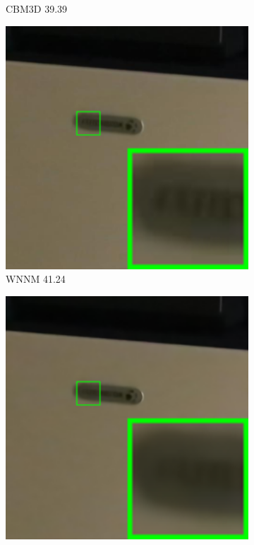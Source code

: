 \begin{figure}
\begin{subfigure}[t]{0.19\textwidth}
		\caption{CBM3D 39.39}
    \end{subfigure}
    \hfill
    \begin{subfigure}[t]{0.19\textwidth}
        \centering
        \includegraphics[width=1\textwidth]{images/guided/our/resize_br_WNNM_Canon_80D_ISO12800_IMG_2360_part10.png}
\caption{WNNM 41.24}
    \end{subfigure}
    \hfill
    \begin{subfigure}[t]{0.19\textwidth}
        \centering
        \includegraphics[width=1\textwidth]{images/guided/our/resize_br_CSF_Canon_80D_ISO12800_IMG_2360_part10.png}

\end{subfigure}
\end{figure}
